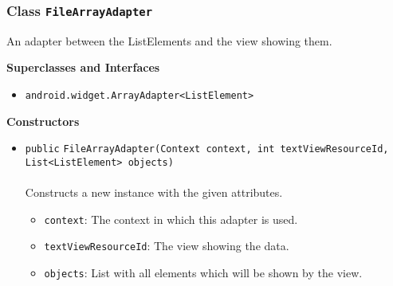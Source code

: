 \subsubsection{Class \lstinline|FileArrayAdapter|}
An adapter between the ListElements and the view showing them. \\
\noindent\begin{minipage}[t]{5cm}
\vspace{0.3em}
\hspace*{2em}
\vspace{0.3em}
\end{minipage}



\textbf{\sffamily Superclasses and Interfaces}
\begin{itemize}
\item \lstinline|android.widget.ArrayAdapter<ListElement>|
\end{itemize}


\textbf{\sffamily Constructors}
\begin{itemize}
\item \lstinline|public| \lstinline|FileArrayAdapter|\lstinline|(Context context, int textViewResourceId, List<ListElement> objects)|\\ \\[-0.6em]
Constructs a new instance with the given attributes.
\begin{itemize}
\item \lstinline|context|: The context in which this adapter is used.
\item \lstinline|textViewResourceId|: The view showing the data.
\item \lstinline|objects|: List with all elements which will be shown by the view.
\end{itemize}



\end{itemize}


